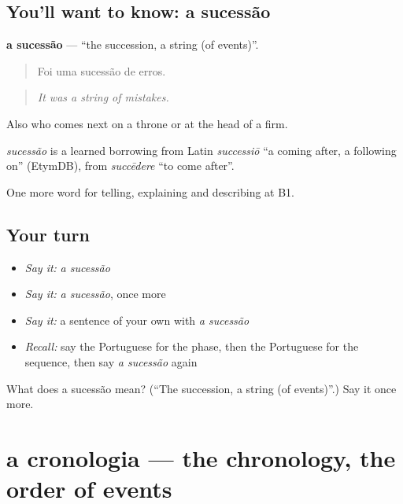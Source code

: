 \subsection*{You'll want to know: a sucessão}
\textbf{a sucessão} — \textquotedblleft{}the succession, a string (of events)\textquotedblright{}.

\begin{quote}
Foi uma sucessão de erros.
\end{quote}

\begin{quote}
\emph{It was a string of mistakes.}
\end{quote}

Also who comes next on a throne or at the head of a firm.

\begin{cousinweb}
\emph{sucessão} is a learned borrowing from Latin \emph{successiō} \textquotedblleft{}a coming after, a following on\textquotedblright{} (EtymDB), from \emph{succēdere} \textquotedblleft{}to come after\textquotedblright{}.
\end{cousinweb}

\begin{grammarlens}[title={What you've built}]
One more word for telling, explaining and describing at B1.
\end{grammarlens}

\subsection*{Your turn}
\begin{itemize}
\raggedright
  \item \emph{Say it:} \emph{a sucessão}
  \item \emph{Say it:} \emph{a sucessão}, once more
  \item \emph{Say it:} a sentence of your own with \emph{a sucessão}
  \item \emph{Recall:} say the Portuguese for the phase, then the Portuguese for the sequence, then say \emph{a sucessão} again
\end{itemize}

\begin{tcolorbox}[breakable,colback=teal!4,colframe=teal!35!black,title={Before you move on}]
What does a sucessão mean? (\textquotedblleft{}The succession, a string (of events)\textquotedblright{}.) Say it once more.
\end{tcolorbox}
\section[a cronologia]{a cronologia — the chronology, the order of events}

